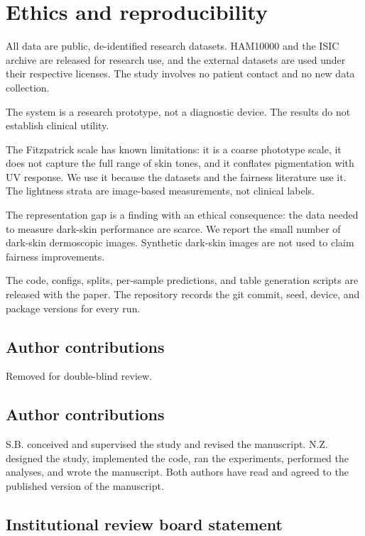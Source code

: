 \section{Ethics and reproducibility}

All data are public, de-identified research datasets. HAM10000 and the ISIC archive are released for research use, and the external datasets are used under their respective licenses. The study involves no patient contact and no new data collection.

The system is a research prototype, not a diagnostic device. The results do not establish clinical utility.

The Fitzpatrick scale has known limitations: it is a coarse phototype scale, it does not capture the full range of skin tones, and it conflates pigmentation with UV response. We use it because the datasets and the fairness literature use it. The lightness strata are image-based measurements, not clinical labels.

The representation gap is a finding with an ethical consequence: the data needed to measure dark-skin performance are scarce. We report the small number of dark-skin dermoscopic images. Synthetic dark-skin images are not used to claim fairness improvements.

The code, configs, splits, per-sample predictions, and table generation scripts are released with the paper. The repository records the git commit, seed, device, and package versions for every run.

\ifdefined\blindmode
\subsection*{Author contributions}

Removed for double-blind review.
\else
\subsection*{Author contributions}

S.B. conceived and supervised the study and revised the manuscript. N.Z. designed the study, implemented the code, ran the experiments, performed the analyses, and wrote the manuscript. Both authors have read and agreed to the published version of the manuscript.
\fi

\subsection*{Institutional review board statement}

